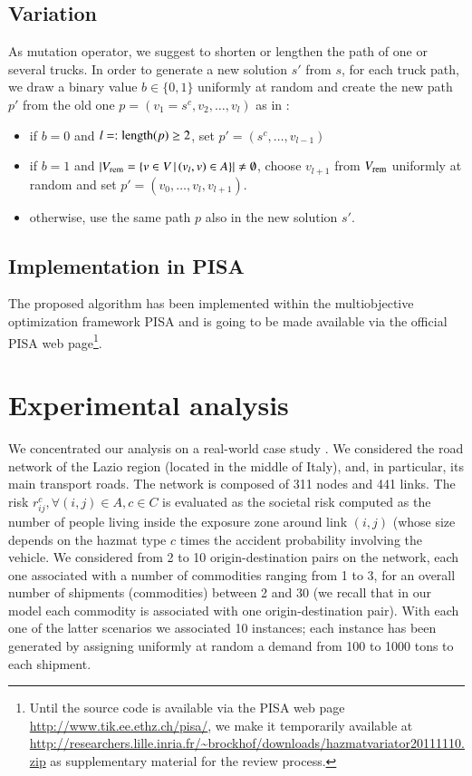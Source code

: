 \documentclass[preprint,12pt]{elsarticle}
\begin{document}
\subsection{Variation}\label{sec:variation}
As mutation operator, we suggest to shorten or lengthen the path of one or several trucks. In order to generate a new solution $s'$ from $s$, for each truck path, we draw a binary value $b\in\{0,1\}$ uniformly at random and create the new path $p'$ from the old one $p=(v_1=s^c,v_2,\ldots, v_l)$ as in \citep{horo2009a}:
\begin{itemize}
	\item if $b = 0$ and $l=:\textnormal{length}(p)\geq 2$, set $p' = (s^c, \ldots, v_{l-1})$	
	\item if $b = 1$ and $|V_{\textnormal{\scriptsize rem}}=\{v \in V \,|\, (v_{l}, v) \in A\}| \neq\emptyset$, choose $v_{l+1}$ from $V_{\textnormal{\scriptsize rem}}$ uniformly at random and set $p' = (v_0, \ldots, v_l, v_{l+1})$.
	\item otherwise, use the same path $p$ also in the new solution $s'$.
\end{itemize}

\subsection{Implementation in PISA}
The proposed algorithm has been implemented within the multiobjective optimization framework PISA \citep{bltz2003a} and is going to be made available via the official PISA web page\footnote{Until the source code is available via the PISA web page \url{http://www.tik.ee.ethz.ch/pisa/}, we make it temporarily available at \url{http://researchers.lille.inria.fr/~brockhof/downloads/hazmatvariator20111110.zip} as supplementary material for the review process.}.

\section{Experimental analysis}

We concentrated our analysis on a real-world case study \cite{bianco09}. We considered the road network of the Lazio region (located in the middle of Italy), and, in particular, its main transport roads. The network is composed of 311 nodes and 441 links. The risk $r_{ij}^c, \forall (i,j) \in A, c \in C$ is evaluated as the societal risk computed as the number of people living inside the exposure zone around link $(i,j)$ (whose size depends on the hazmat type $c$ times the accident probability involving the vehicle. We considered from 2 to 10 origin-destination pairs on the network, each one associated with a number of commodities ranging from 1 to 3, for an overall number of shipments (commodities) between 2 and 30 (we recall that in our model each commodity is associated with one origin-destination pair). With each one of the latter scenarios we associated 10 instances; each instance has been generated by assigning uniformly at random a demand from 100 to 1000 tons to each shipment.
\end{document}
